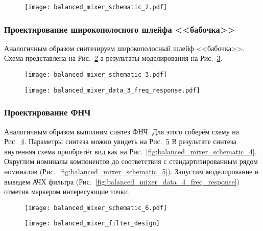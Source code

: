 \begin{figure}[!ht]
    \centering
    \texttt{[image: balanced\_mixer\_schematic\_2.pdf]}
    \caption{}%
    \label{fig:balanced_mixer_schematic_2}
\end{figure}

\subsubsection{Проектирование широкополосного шлейфа <<бабочка>>}

Аналогичным образом синтезируем широкополосный шлейф <<бабочка>>.
Схема представлена на Рис.~\ref{fig:balanced_mixer_schematic_3} а результаты моделирования на Рис.~\ref{fig:balanced_mixer_data_3_freq_response}.

\begin{figure}[!ht]
    \centering
    \texttt{[image: balanced\_mixer\_schematic\_3.pdf]}
    \caption{}%
    \label{fig:balanced_mixer_schematic_3}
\end{figure}

\begin{figure}[!ht]
    \centering
    \texttt{[image: balanced\_mixer\_data\_3\_freq\_response.pdf]}
    \caption{}%
    \label{fig:balanced_mixer_data_3_freq_response}
\end{figure}

\subsubsection{Проектирование ФНЧ}

Аналогичным образом выполним синтез ФНЧ.
Для этого соберём схему на Рис.~\ref{fig:balanced_mixer_schematic_6}.
Параметры синтеза можно увидеть на Рис.~\ref{fig:balanced_mixer_filter_design}
В результате синтеза внутенняя схема приобретёт вид как на Рис.~\ref{fig:balanced_mixer_schematic_4}.
Округлим номиналы компонентов до соответствия с стандартизированным рядом номиналов (Рис.~\ref{fig:balanced_mixer_schematic_5}).
Запустим моделирование и выведем АЧХ фильтра (Рис.~\ref{fig:balanced_mixer_data_4_freq_response}) отметив маркером интересующие точки.

\begin{figure}[!ht]
    \centering
    \texttt{[image: balanced\_mixer\_schematic\_6.pdf]}
    \caption{}%
    \label{fig:balanced_mixer_schematic_6}
\end{figure}

\begin{figure}[!ht]
    \centering
    \texttt{[image: balanced\_mixer\_filter\_design]}
    \caption{}%
    \label{fig:balanced_mixer_filter_design}
\end{figure}

